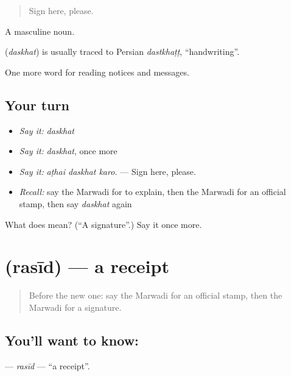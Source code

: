 \begin{quote}
Sign here, please.
\end{quote}

A masculine noun.

\begin{cousinweb}
\textbf{} (\emph{daskhat}) is usually traced to Persian \emph{dastkhaṭṭ}, \textquotedblleft{}handwriting\textquotedblright{}.
\end{cousinweb}

\begin{grammarlens}[title={What you've built}]
One more word for reading notices and messages.
\end{grammarlens}

\subsection*{Your turn}
\begin{itemize}
\raggedright
  \item \emph{Say it:} \emph{daskhat}
  \item \emph{Say it:} \emph{daskhat}, once more
  \item \emph{Say it:} \emph{aṭhai daskhat karo.} — Sign here, please.
  \item \emph{Recall:} say the Marwadi for to explain, then the Marwadi for an official stamp, then say \emph{daskhat} again
\end{itemize}

\begin{tcolorbox}[breakable,colback=teal!4,colframe=teal!35!black,title={Before you move on}]
What does  mean? (\textquotedblleft{}A signature\textquotedblright{}.) Say it once more.
\end{tcolorbox}
\section[\texorpdfstring{\mw{रसीद} (rasīd)}{रसीद (rasīd)}]{ (rasīd) — a receipt}

\label{lesson:MW-C199-rasid}



\begin{quote}
Before the new one: say the Marwadi for an official stamp, then the Marwadi for a signature.
\end{quote}

\subsection*{You'll want to know: }
\textbf{} — \emph{rasīd} — \textquotedblleft{}a receipt\textquotedblright{}.

